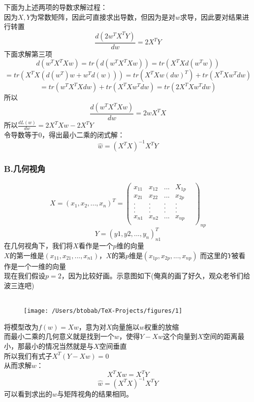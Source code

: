 \documentclass{report}
\begin{document}
下面为上述两项的导数求解过程：\\
因为$X,Y$为常数矩阵，因此可直接求出导数，但因为是对$w$求导，因此要对结果进行转置
$$
\frac{d(2w^TX^TY)}{dw}=2X^TY
$$
下面求解第三项
$$
d(w^TX^TXw)=tr(d(w^TX^TXw))=tr(X^TXd(w^Tw))
$$
$$
=tr(X^TX(d(w^T)w+w^Td(w)))=tr(X^TXw(dw)^T)+tr(X^TXw^Tdw)
$$
$$
=tr(w^TX^TXdw)+tr(X^TXw^Tdw)=tr(2X^TXw^Tdw)
$$
所以
$$
\frac{d(w^TX^TXw)}{dw}=2wX^TX
$$
所以$\frac{dL(w)}{dw}=2X^TXw-2X^TY$\\
令导数等于0，得出最小二乘的闭式解：
$$
\hat{w}=(X^TX)^{-1}X^TY
$$
\subsubsection{B.几何视角}
$$
X=(x_1,x_2,...,x_n)^T=\begin{pmatrix}
x_{11}&x_{12}&...&X_{1p}\\
x_{21}&x_{22}&...&x_{2p}\\
.&.&.&.&\\
.&.&.&.&\\
.&.&.&.&\\
x_{n1}&x_{n2}&...&x_{np}\\
\end{pmatrix}_{np}
$$
$$
Y=(y1,y2,...,y_n)_{n1}^T
$$
在几何视角下，我们将$X$看作是一个$p$维的向量\\
$X$的第一维是$(x_{11},x_{21},...,x_{n1})$，$X$的第$p$维是$(x_{1p},x_{2p},...,x_{np})$
而这里的$Y$被看作是一个一维的向量\\
现在我们假设$p=2$，因为比较好画。示意图如下(俺真的画了好久，观众老爷们给波三连吧)\\\\
\begin{figure}
\center
\texttt{[image: /Users/btobab/TeX-Projects/figures/1]}
\end{figure}
将模型改为$f(w)=Xw$，意为对$X$向量施以$w$权重的放缩\\
而最小二乘的几何意义就是找到一个$w$，使得$Y-Xw$这个向量到$X$空间的距离最小，那最小的情况当然就是与$X$空间垂直\\
所以我们有式子$X^T(Y-Xw)=0$\\
从而求解$w$：
$$
X^TXw=X^TY
$$
$$
\hat{w}=(X^TX)^{-1}X^TY
$$
可以看到求出的$w$与矩阵视角的结果相同。
\end{document}
